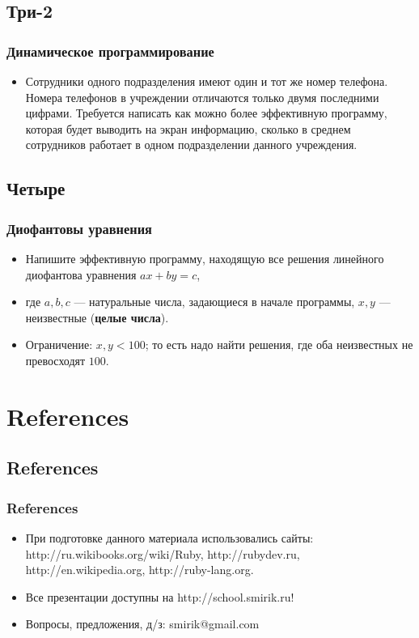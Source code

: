 \documentclass[compress,red]{beamer}
\begin{document}
\subsection{Три-2}
\begin{frame}[fragile]
  \frametitle{Динамическое программирование}
  \begin{itemize}
    \item Сотрудники одного подразделения имеют один и тот же номер телефона. Номера телефонов в учреждении отличаются только двумя последними цифрами. Требуется написать как можно более эффективную программу, которая будет выводить на экран информацию, сколько в среднем сотрудников работает в одном подразделении данного учреждения.
  \end{itemize}
\end{frame}

\subsection{Четыре}
\begin{frame}[fragile]
  \frametitle{Диофантовы уравнения}
  \begin{itemize}
    \item Напишите эффективную программу, находящую все решения линейного диофантова уравнения $ax+by=c$,
    \item где $a, b, c$ --- натуральные числа, задающиеся в начале программы, $x, y$ --- неизвестные (\textbf{целые числа}).
    \item Ограничение: $x,y < 100$; то есть надо найти решения, где оба неизвестных не превосходят $100$.
  \end{itemize}
\end{frame}

\section{References}
\subsection{References}
\begin{frame}[fragile]
  \frametitle{References}
  \begin{itemize}
    \item При подготовке данного материала использовались сайты: http://ru.wikibooks.org/wiki/Ruby, http://rubydev.ru, http://en.wikipedia.org, http://ruby-lang.org.
    \item Все презентации доступны на http://school.smirik.ru!
    \item Вопросы, предложения, д/з: smirik@gmail.com
  \end{itemize}
\end{frame}
\end{document}
